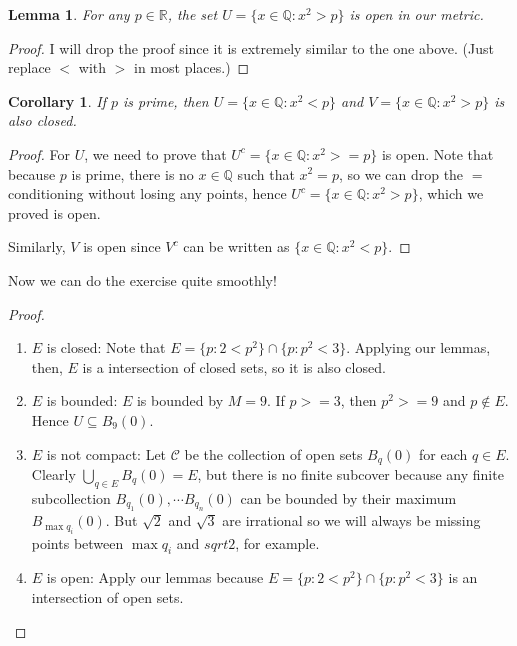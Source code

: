 \documentclass[12pt]{article}
\newtheorem*{corollary}{Corollary}
\newtheorem*{lemma}{Lemma}
\theoremstyle{remark}
\theoremstyle{named}
\begin{document}
\begin{lemma}
    For any \(p \in \mathbb R\), the set \(U = \{x \in \mathbb Q : x^2 > p\}\) is open in our metric.
\end{lemma}

\begin{proof}
    I will drop the proof since it is extremely similar to the one above. (Just replace \(<\) with \(>\) in most places.)
\end{proof}

\begin{corollary}
    If \(p\) is prime, then \(U = \{x \in \mathbb Q : x^2 < p\}\) and \(V = \{x \in \mathbb Q : x^2 > p\}\) is also closed.
\end{corollary}

\begin{proof}
    For \(U\), we need to prove that \(U^c = \{x \in \mathbb Q : x^2 >= p\}\) is open. Note that because \(p\) is prime, there is no \(x \in \mathbb Q\) such that \(x^2 = p\), so we can drop the \(=\) conditioning without losing any points, hence \(U^c = \{x \in \mathbb Q : x^2 > p\}\), which we proved is open. 

    Similarly, \(V\) is open since \(V^c\) can be written as \(\{x \in \mathbb Q : x^2 < p\}\).
\end{proof}

Now we can do the exercise quite smoothly!

\begin{proof}
    \begin{enumerate}
        \item \(E\) is closed: Note that \(E = \{p : 2 < p^2\} \cap \{p : p^2 < 3\}\). Applying our lemmas, then, \(E\) is a intersection of closed sets, so it is also closed.
        
        \item \(E\) is bounded: \(E\) is bounded by \(M = 9\). If \(p >= 3\), then \(p^2 >= 9\) and \(p \notin E\). Hence \(U \subseteq B_9(0)\).
        
        \item \(E\) is not compact: Let \(\mathcal C\) be the collection of open sets \(B_q(0)\) for each \(q \in E\). Clearly \(\bigcup_{q \in E} B_q(0) = E\), but there is no finite subcover because any finite subcollection \(B_{q_1}(0), \cdots B_{q_n}(0)\) can be bounded by their maximum \(B_{\max{q_i}}(0)\). But \(\sqrt 2\) and \(\sqrt 3\) are irrational so we will always be missing points between \(\max q_i\) and \(sqrt 2\), for example.
        
        \item \(E\) is open: Apply our lemmas because \(E = \{p : 2 < p^2\} \cap \{p : p^2 < 3\}\) is an intersection of open sets.
    \end{enumerate}
\end{proof}
\end{document}
